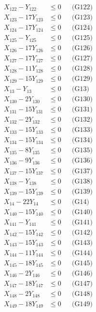 \documentclass[a4paper,10pt]{article}
\begin{document}
{\begin{align}
X_{122} - Y_{122} &\leq 0 && \text{(G122)} \\
X_{123} - 17Y_{123} &\leq 0 && \text{(G123)} \\
X_{124} - 17Y_{124} &\leq 0 && \text{(G124)} \\
X_{125} - Y_{125} &\leq 0 && \text{(G125)} \\
X_{126} - 17Y_{126} &\leq 0 && \text{(G126)} \\
X_{127} - 17Y_{127} &\leq 0 && \text{(G127)} \\
X_{128} - 11Y_{128} &\leq 0 && \text{(G128)} \\
X_{129} - 15Y_{129} &\leq 0 && \text{(G129)} \\
X_{13} - Y_{13} &\leq 0 && \text{(G13)} \\
X_{130} - 2Y_{130} &\leq 0 && \text{(G130)} \\
X_{131} - 15Y_{131} &\leq 0 && \text{(G131)} \\
X_{132} - 2Y_{132} &\leq 0 && \text{(G132)} \\
X_{133} - 15Y_{133} &\leq 0 && \text{(G133)} \\
\allowbreak
X_{134} - 15Y_{134} &\leq 0 && \text{(G134)} \\
X_{135} - 8Y_{135} &\leq 0 && \text{(G135)} \\
X_{136} - 9Y_{136} &\leq 0 && \text{(G136)} \\
X_{137} - 15Y_{137} &\leq 0 && \text{(G137)} \\
X_{138} - Y_{138} &\leq 0 && \text{(G138)} \\
X_{139} - 15Y_{139} &\leq 0 && \text{(G139)} \\
X_{14} - 22Y_{14} &\leq 0 && \text{(G14)} \\
X_{140} - 15Y_{140} &\leq 0 && \text{(G140)} \\
X_{141} - Y_{141} &\leq 0 && \text{(G141)} \\
X_{142} - 15Y_{142} &\leq 0 && \text{(G142)} \\
X_{143} - 15Y_{143} &\leq 0 && \text{(G143)} \\
X_{144} - 11Y_{144} &\leq 0 && \text{(G144)} \\
X_{145} - 18Y_{145} &\leq 0 && \text{(G145)} \\
X_{146} - 2Y_{146} &\leq 0 && \text{(G146)} \\
X_{147} - 18Y_{147} &\leq 0 && \text{(G147)} \\
X_{148} - 2Y_{148} &\leq 0 && \text{(G148)} \\
X_{149} - 18Y_{149} &\leq 0 && \text{(G149)} \\

\end{align}}
\end{document}

